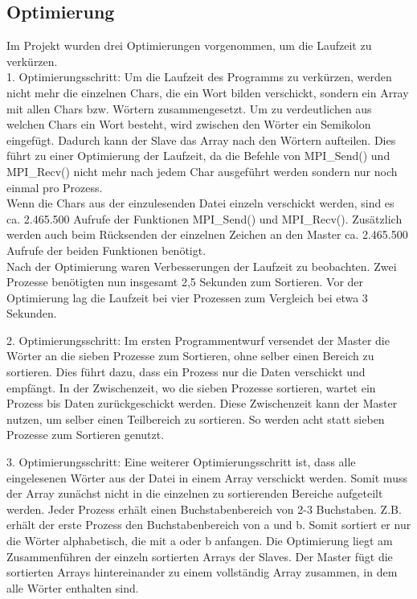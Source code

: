 \subsection{Optimierung}
Im Projekt wurden drei Optimierungen vorgenommen, um die Laufzeit zu verkürzen.\\

1. Optimierungsschritt: Um die Laufzeit des Programms zu verkürzen, werden nicht mehr die einzelnen Chars, die ein Wort bilden verschickt, sondern ein Array  mit allen Chars bzw. Wörtern zusammengesetzt. Um zu verdeutlichen aus welchen Chars ein Wort besteht, wird zwischen den Wörter ein Semikolon eingefügt. Dadurch kann der Slave das Array nach den Wörtern aufteilen. Dies führt zu einer Optimierung der Laufzeit, da die Befehle von MPI\_Send() und MPI\_Recv() nicht mehr nach jedem Char ausgeführt werden sondern nur noch einmal pro Prozess. \\
Wenn die Chars aus der einzulesenden Datei einzeln verschickt werden, sind es ca. 2.465.500 Aufrufe der Funktionen MPI\_Send() und MPI\_Recv(). Zusätzlich werden auch beim Rücksenden der einzelnen Zeichen an den Master ca. 2.465.500 Aufrufe der beiden Funktionen benötigt.\\
Nach der Optimierung waren Verbesserungen der Laufzeit zu beobachten. Zwei Prozesse benötigten nun insgesamt 2,5 Sekunden zum Sortieren. Vor der Optimierung lag die Laufzeit bei vier Prozessen zum Vergleich bei etwa 3 Sekunden.  

2. Optimierungsschritt: Im ersten Programmentwurf versendet der Master die Wörter an die sieben Prozesse zum Sortieren, ohne selber einen Bereich zu sortieren. Dies führt dazu, dass ein Prozess nur die Daten verschickt und empfängt. In der Zwischenzeit, wo die sieben Prozesse sortieren, wartet ein Prozess bis Daten zurückgeschickt werden. Diese Zwischenzeit kann der Master nutzen, um selber einen Teilbereich zu sortieren. So werden acht statt sieben Prozesse zum Sortieren genutzt.  

3. Optimierungsschritt: Eine weiterer Optimierungsschritt ist, dass alle eingelesenen Wörter aus der Datei in einem Array verschickt werden. Somit muss der Array zunächst nicht in die einzelnen zu sortierenden Bereiche aufgeteilt werden. Jeder Prozess erhält einen Buchstabenbereich von 2-3 Buchstaben. Z.B. erhält der erste Prozess den Buchstabenbereich von a und b. Somit sortiert er nur die Wörter alphabetisch, die mit a oder b anfangen. Die Optimierung liegt am Zusammenführen der einzeln sortierten Arrays der Slaves. Der Master fügt die sortierten Arrays hintereinander zu einem vollständig Array zusammen, in dem alle Wörter enthalten sind. \\